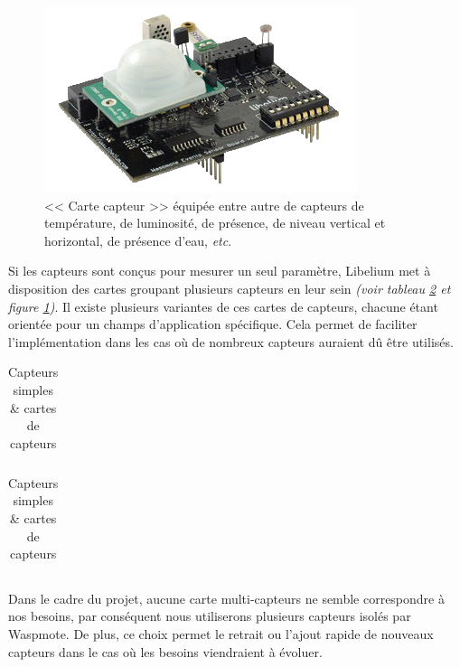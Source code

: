         \begin{figure}[h]
            \centering
            \includegraphics[scale=0.80]{images/photos/event-board-2.png}
            \caption{<< Carte capteur >> équipée entre autre de capteurs de température, de luminosité, de présence, de niveau vertical et horizontal, de présence d'eau, \textit{etc}.}
            \label{fig:capt}
        \end{figure}
        
        Si les capteurs sont conçus pour mesurer un seul paramètre, Libelium met à disposition des cartes groupant plusieurs capteurs en leur sein \textit{(voir tableau \ref{tab:capteurs} et figure \ref{fig:capt})}. Il existe plusieurs variantes de ces cartes de capteurs, chacune étant orientée pour un champs d'application spécifique. Cela permet de faciliter l'implémentation dans les cas où de nombreux capteurs auraient dû être utilisés.\\
        
        \begin{table}[h]
            \centering
            \begin{tabular}[t]{l | l}
                
            \end{tabular}
            \hspace{1cm}
            \begin{tabular}[t]{l | l}
                
            \end{tabular}
            \caption{Capteurs simples \& cartes de capteurs}
            \label{tab:capteurs}
        \end{table}
        
        \paragraph{}Dans le cadre du projet, aucune carte multi-capteurs ne semble correspondre à nos besoins, par conséquent nous utiliserons plusieurs capteurs isolés par Waspmote. De plus, ce choix permet le retrait ou l'ajout rapide de nouveaux capteurs dans le cas où les besoins viendraient à évoluer.
        
